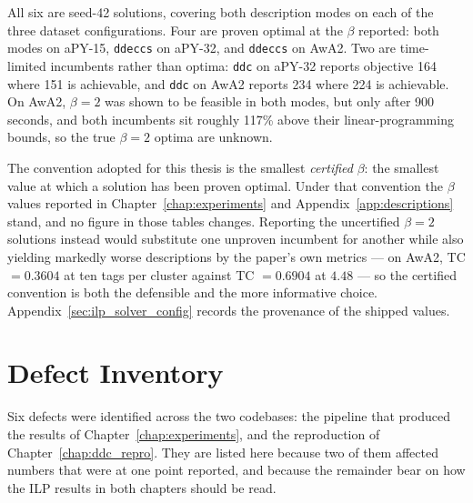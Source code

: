 All six are seed-42 solutions, covering both description modes on each of the three dataset configurations. Four are proven optimal at the $\beta$ reported: both modes on aPY-15, \texttt{ddeccs} on aPY-32, and \texttt{ddeccs} on AwA2. Two are time-limited incumbents rather than optima: \texttt{ddc} on aPY-32 reports objective 164 where 151 is achievable, and \texttt{ddc} on AwA2 reports 234 where 224 is achievable. On AwA2, $\beta = 2$ was shown to be feasible in both modes, but only after 900 seconds, and both incumbents sit roughly 117\% above their linear-programming bounds, so the true $\beta = 2$ optima are unknown.

The convention adopted for this thesis is the smallest \emph{certified} $\beta$: the smallest value at which a solution has been proven optimal. Under that convention the $\beta$ values reported in Chapter~\ref{chap:experiments} and Appendix~\ref{app:descriptions} stand, and no figure in those tables changes. Reporting the uncertified $\beta = 2$ solutions instead would substitute one unproven incumbent for another while also yielding markedly worse descriptions by the paper's own metrics --- on AwA2, TC $= 0.3604$ at ten tags per cluster against TC $= 0.6904$ at $4.48$ --- so the certified convention is both the defensible and the more informative choice. Appendix~\ref{sec:ilp_solver_config} records the provenance of the shipped values.

\section{Defect Inventory}
\label{sec:c_defects}

Six defects were identified across the two codebases: the pipeline that produced the results of Chapter~\ref{chap:experiments}, and the reproduction of Chapter~\ref{chap:ddc_repro}. They are listed here because two of them affected numbers that were at one point reported, and because the remainder bear on how the ILP results in both chapters should be read.

